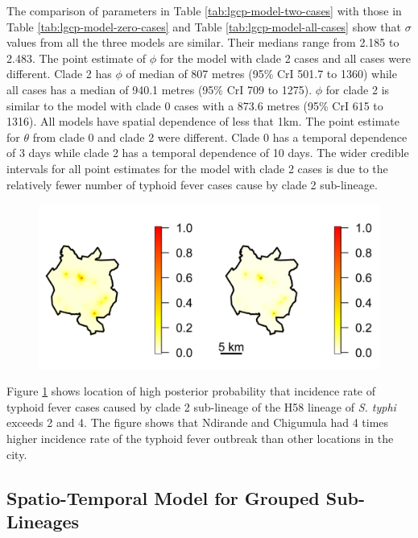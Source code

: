 The comparison of parameters in Table \ref{tab:lgcp-model-two-cases} with those in Table \ref{tab:lgcp-model-zero-cases} and Table \ref{tab:lgcp-model-all-cases} show that $\sigma$ values from all the three models are similar. Their medians range from 2.185 to 2.483. The point estimate of $\phi$ for the model with clade 2 cases and all cases were different. Clade 2 has $\phi$ of median of 807 metres (95\% CrI 501.7 to 1360) while all cases has a median of 940.1 metres (95\% CrI 709 to 1275). $\phi$ for clade 2 is similar to the model with clade 0 cases with a 873.6 metres (95\% CrI 615 to 1316). All models have spatial dependence of less that 1km. The point estimate for $\theta$ from clade 0 and clade 2 were different. Clade 0 has a temporal dependence of 3 days while clade 2 has a temporal dependence of 10 days. The wider credible intervals for all point estimates for the model with clade 2 cases is due to the relatively fewer number of typhoid fever cases cause by clade 2 sub-lineage.

\begin{figure}[H]
    \begin{center}
        \includegraphics[scale=1]{Exceedance Probabilities - Major 2.png}
    \end{center}
     \label{fig:exceedance-plot-two-cases}
\end{figure}

Figure \ref{fig:exceedance-plot-two-cases} shows location of high posterior probability that incidence rate of typhoid fever cases caused by clade 2 sub-lineage of the H58 lineage of \textit{S. typhi} exceeds 2 and 4. The figure shows that Ndirande and Chigumula had 4 times higher incidence rate of the typhoid fever outbreak than other locations in the city.

\subsection{Spatio-Temporal Model for Grouped Sub-Lineages}

